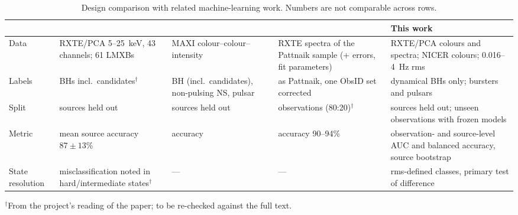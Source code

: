 \documentclass[11pt,a4paper]{article}
\begin{document}
\begin{table}[h]
\centering\footnotesize
\caption{Design comparison with related machine-learning work. Numbers are not comparable across rows.}\label{tab:lit}
\begin{tabularx}{\textwidth}{@{}l *{4}{>{\raggedright\arraybackslash}X}@{}}
\toprule
 & \citet{Pattnaik2021} & \citet{deBeurs2022} & \citet{Garg2026} & This work \\
\midrule
Data & RXTE/PCA 5--25~keV, 43 channels; 61 LMXBs & MAXI colour--colour--intensity & RXTE spectra of the Pattnaik sample (+ errors, fit parameters) & RXTE/PCA colours and spectra; NICER colours; 0.016--4~Hz rms \\
Labels & BHs incl.\ candidates$^{\dagger}$ & BH (incl.\ candidates), non-pulsing NS, pulsar & as Pattnaik, one ObsID set corrected & dynamical BHs only; bursters and pulsars \\
Split & sources held out & sources held out & observations (80:20)$^{\dagger}$ & sources held out; unseen observations with frozen models \\
Metric & mean source accuracy $87\pm13$\% & accuracy & accuracy 90--94\% & observation- and source-level AUC and balanced accuracy, source bootstrap \\
State resolution & misclassification noted in hard/intermediate states$^{\dagger}$ & --- & --- & rms-defined classes, primary test of difference \\
\bottomrule
\end{tabularx}

\smallskip\raggedright\footnotesize $^{\dagger}$From the project's reading of the paper; to be re-checked against the full text.
\end{table}
\end{document}
